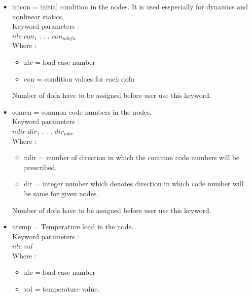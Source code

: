 \documentclass[12pt]{book}
\begin{document}
\begin{itemize}
\item inicon = initial condition in the nodes. It is used esspecially for
         dynamics and nonlinear statics.\\
         Keyword parameters :\\
         $nlc$ $con_1$ . . . $con_{ndofn}$\\
         Where :
         \begin{itemize}
         \item nlc  = load case number
         \item con  = condition values for each dofn
         \end{itemize}
         Number of dofn have to be assigned before user use this keyword.
\item comcn = common code numbers in the nodes.\\
        Keyword parameters :\\
        $ndir$ $dir_1$ . . .  $dir_{ndir}$\\
        Where :
        \begin{itemize}
        \item ndir = number of direction in which the common code numbers
               will be prescribed.
        \item dir  = integer number which denotes direction in which code number
               will be same for given nodes.
        \end{itemize}
        Number of dofn have to be assigned before user use this keyword.
\item ntemp = Temperature load in the node.\\
        Keyword parameters :\\
        $nlc$ $val$\\
        Where :
        \begin{itemize}
        \item nlc = load case number
        \item val = temperature value.\\ \\
        \end{itemize} 
\end{itemize} %
\end{document}
